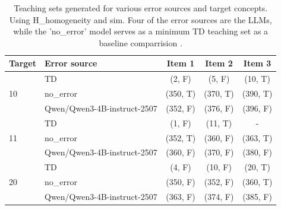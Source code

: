 \begin{table}[h]
\centering
\begin{tabular}{llccc}
\toprule
Target & Error source & Item 1 & Item 2 & Item 3 \\
\midrule
\multirow{3}{*}{10} & TD & (2, F) & (5, F) & (10, T) \\
 & no\_error & (350, T) & (370, T) & (390, T) \\
 & Qwen/\allowbreak Qwen3-4B-instruct-2507 & (352, F) & (376, F) & (396, F) \\
\midrule
\multirow{3}{*}{11} & TD & (1, F) & (11, T) & - \\
 & no\_error & (352, T) & (360, F) & (363, T) \\
 & Qwen/\allowbreak Qwen3-4B-instruct-2507 & (360, F) & (370, F) & (380, F) \\
\midrule
\multirow{3}{*}{20} & TD & (4, F) & (10, F) & (20, T) \\
 & no\_error & (350, F) & (352, F) & (360, T) \\
 & Qwen/\allowbreak Qwen3-4B-instruct-2507 & (363, F) & (374, F) & (385, F) \\
\midrule
\bottomrule
\end{tabular}
\caption{Teaching sets generated for various error sources and target concepts. Using H\_homogeneity and sim. Four of the error sources are the LLMs, while the 'no\_error' model serves as a minimum TD teaching set as a baseline comparrision .}
\end{table}